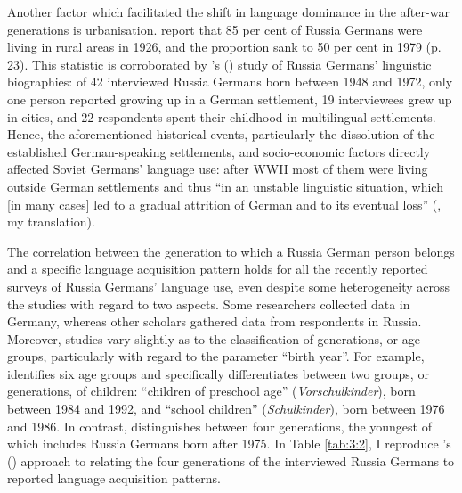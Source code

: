 Another factor which facilitated the shift in language dominance in the after-war generations is urbanisation. \citet{berend-riehl} report that 85 per cent of Russia Germans were living in rural areas in 1926, and the proportion sank to 50 per cent in 1979 (p. 23). This statistic is corroborated by \citeauthor{meng01}'s (\citeyear[83]{meng01}) study of Russia Germans' linguistic biographies: of 42 interviewed Russia Germans born between 1948 and 1972, only one person reported growing up in a German settlement, 19 interviewees grew up in cities, and 22 respondents spent their childhood in multilingual settlements. Hence, the aforementioned historical events, particularly the dissolution of the established German-speaking settlements, and socio-economic factors directly affected Soviet Germans' language use: after WWII most of them were living outside German settlements and thus ``in an unstable linguistic situation, which [in many cases] led to a gradual attrition of German and to its eventual loss'' (\citealt[20]{berend98}, my translation).

The correlation between the generation to which a Russia German person belongs and a specific language acquisition pattern holds for all the recently reported surveys of Russia Germans' language use, even despite some heterogeneity across the studies with regard to two aspects. Some researchers \citep[e.g.,][]{berend98,meng01} collected data in Germany, whereas other scholars \citep[e.g.,][]{blankenhorn,riehlTA} gathered data from respondents in Russia. Moreover, studies vary slightly as to the classification of generations, or age groups, particularly with regard to the parameter “birth year”. For example, \citet{meng01} identifies six age groups and specifically differentiates between two groups, or generations, of children: ``children of preschool age'' (\textit{Vorschulkinder}), born between 1984 and 1992, and ``school children'' (\textit{Schulkinder}), born between 1976 and 1986. In contrast, \citet{riehlTA} distinguishes between four generations, the youngest of which includes Russia Germans born after 1975. In Table \ref{tab:3:2}, I reproduce \citeauthor{riehlTA}'s (\citeyear[]{riehlTA}) approach to relating the four generations of the interviewed Russia Germans to reported language acquisition patterns. 

